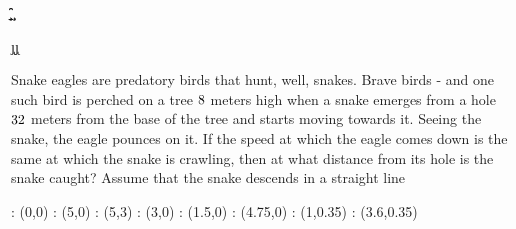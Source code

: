 


\FRACTIONSIMPLIFY\vbone\vbtwo\a\b %
{}\a\b\c\d %
\FRACMULT\a\b\a\b\e\f %
{}\e\f\x\y %
\FRACDIV\c\d\x\y\m\n

\FRACMULT\n\m{}\j\k
\FRACMINUS{}\j\k\ansx\ansy

\question[4] Snake eagles are predatory birds that hunt, well, snakes. 
Brave birds - and one such bird is perched on a tree $8$ meters high when 
a snake emerges from a hole $32$ meters from the base of the tree and starts moving 
towards it. Seeing the snake, the eagle pounces on it. If the speed at which 
the eagle comes down is the same at which the snake is crawling, then at what distance
from its hole is the snake caught? Assume that the snake descends in a straight line                          

\watchout[-70pt]

\ifprintanswers
  \begin{marginfigure}
    : (0,0)
    : (5,0)
    : (5,3)
    : (3,0)
    : (1.5,0)
    : (4.75,0)
    : (1,0.35)
    : (3.6,0.35)
  	\figdrawbegin{}
    \figdrawline [1,2,3,1]
    \figdrawline [3,4]
    \figdrawend
    \centerline{\box\figBoxA}
  \end{marginfigure}
\fi 


